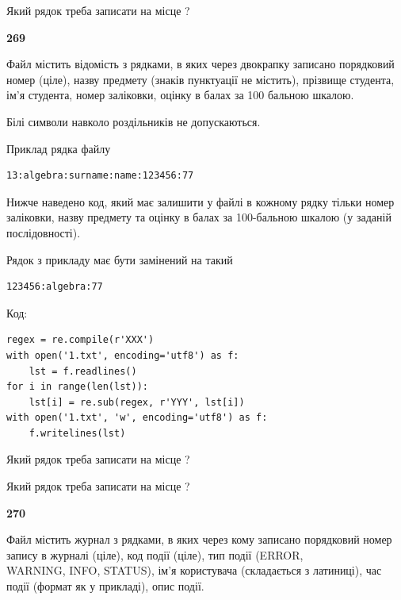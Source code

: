 Який рядок треба записати на місце  ?\par


\newpage

{\begin {center}\textbf{ 269}\end {center}}\par
Файл  містить відомість з рядками, в яких через двокрапку записа\-но поряд\-ковий номер (ціле), назву предмету (знаків пунктуації не містить), прізвище студента, ім'я студента, номер заліковки, оцінку в балах за 100 бальною шкалою.

Білі символи навколо роздільників не допускаються.

Приклад рядка файлу



\begin{verbatim}
13:algebra:surname:name:123456:77
\end{verbatim}


Нижче наведено код, який має залишити у файлі в кожному рядку тільки номер заліковки, назву предмету та оцінку в балах за 100-бальною шкалою (у заданій послі\-дов\-ності).

Рядок з прикладу має бути замінений на такий



\begin{verbatim}
123456:algebra:77
\end{verbatim}




Код:



\begin{verbatim}
regex = re.compile(r'XXX')
with open('1.txt', encoding='utf8') as f:
    lst = f.readlines()
for i in range(len(lst)):
    lst[i] = re.sub(regex, r'YYY', lst[i])
with open('1.txt', 'w', encoding='utf8') as f:
    f.writelines(lst)
\end{verbatim}







Який рядок треба записати на місце  ?\par
\vspace{5mm}


Який рядок треба записати на місце  ?\par


\newpage

{\begin {center}\textbf{ 270}\end {center}}\par
Файл  містить журнал з рядками, в яких через кому записано поряд\-ко\-вий номер запису в журналі (ціле), код події (ціле), тип події (ERROR, \\WARNING, INFO, STATUS), ім'я користувача (складається з латиниці), час події (фор\-мат як у прикладі), опис події.

